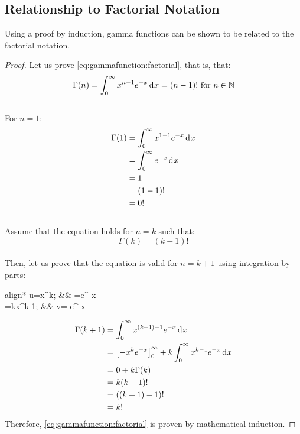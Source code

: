 \documentclass[12pt]{article}
\begin{document}

\pagebreak
\subsection{Relationship to Factorial Notation}
Using a proof by induction, gamma functions can be shown to be related to the factorial notation.
\begin{proof}
	Let us prove \autoref{eq:gammafunction:factorial}, that is, that:\\[-18pt]
	\begin{equation}
		\Gamma(n) = \int^\infty_0 x^{n-1}e^{-x}\mathop{}\!\mathrm{d^{}}x = (n-1)!\text{ for }n\in\mathbb{N}
	\end{equation}\\[-30pt]
	For $n=1$:\\[-18pt]
	\begin{equation}
		\begin{split}
			\Gamma(1)	&=	\int^\infty_0 x^{1-1}e^{-x}\mathop{}\!\mathrm{d^{}}x\\
						&=	\int^\infty_0 e^{-x}\mathop{}\!\mathrm{d^{}}x\\
						&=	1\\
						&=	(1-1)!\\
						&=	0!
		\end{split}
	\end{equation}\\[-24pt]
	Assume that the equation holds for $n=k$ such that:\\[-18pt]
	\begin{equation}
		\Gamma(k) = (k-1)!
	\end{equation}\\[-30pt]
	Then, let us prove that the equation is valid for $n=k+1$ using integration by parts:\\[-12pt]
	\begin{empheq}[box=\widefbox]{align*}
		u=x^{k};					&&	=e^{-x}\\
		=kx^{k-1};	&&	v=-e^{-x}
	\end{empheq}
	\begin{equation}
		\begin{split}
			\Gamma(k+1)	&=	\int^\infty_0 x^{(k+1)-1}e^{-x}\mathop{}\!\mathrm{d^{}}x\\
						&=	\left[-x^k e^{-x}\right]^\infty_0 + k\int^\infty_0 x^{k-1}e^{-x}\mathop{}\!\mathrm{d^{}}x\\
						&=	0 +k\Gamma(k)\\
						&=	k(k-1)!\\
						&=	((k+1)-1)!\\
						&=	k!
		\end{split}
	\end{equation}
	Therefore, \autoref{eq:gammafunction:factorial} is proven by mathematical induction.
\end{proof}
\end{document}
